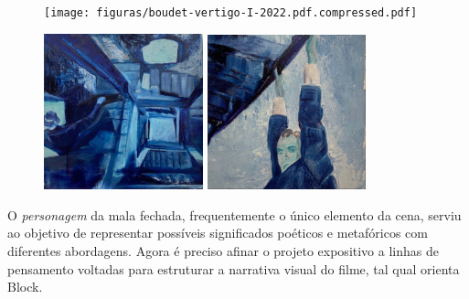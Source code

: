 \begin{figure}
  \begin{minipage}{.3\linewidth}
  \caption{ \phantom{aaaaaaa}}

	\texttt{[image: figuras/boudet-vertigo-I-2022.pdf.compressed.pdf]}
\end{minipage}\hfill
\begin{minipage}{.3\linewidth}
	\caption{}

	\includegraphics[width=1.8125in,height=1.77709in]{figuras/boudet-vertigo-II-2022.pdf.compressed.pdf}
\end{minipage}\hfill
\begin{minipage}{.3\linewidth}
	\caption{}

	\includegraphics[width=1.81045in,height=1.76806in]{figuras/boudet-vertigo-III-2022.pdf.compressed.pdf}
\end{minipage}
\end{figure}

O \emph{personagem} da mala fechada, frequentemente o único elemento da
cena, serviu ao objetivo de representar possíveis significados poéticos
e metafóricos com diferentes abordagens. Agora é preciso afinar o
projeto expositivo a linhas de pensamento voltadas para estruturar a
narrativa visual do filme, tal qual orienta Block.

